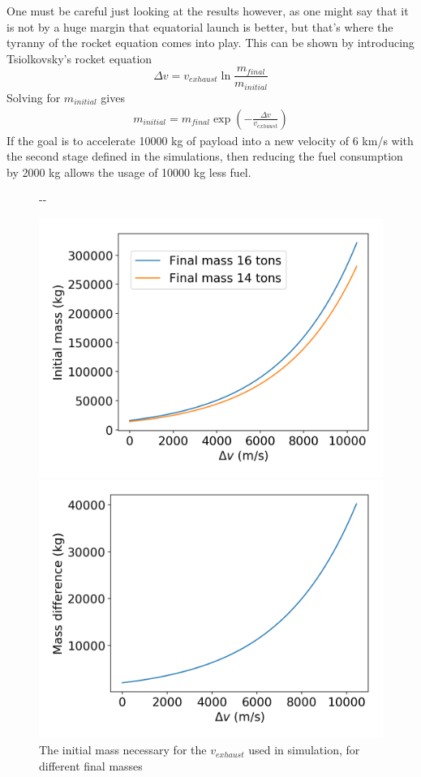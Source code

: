 \documentclass[11pt]{article}
\newlength{\offsetpage}
\newenvironment{widepage}{\begin{adjustwidth}{-\offsetpage}{-\offsetpage}%
    \addtolength{\textwidth}{2\offsetpage}}%
{\end{adjustwidth}}
\begin{document}
One must be careful just looking at the results however, as one might say that it is not by a huge margin that equatorial launch is better, 
but that's where the tyranny of the rocket equation comes into play.
This can be shown by introducing Tsiolkovsky's rocket equation
$$
\Delta v = v_{exhaust} \ln \frac{m_{final}}{m_{initial}}
$$
Solving for $m_{initial}$ gives
$$
\begin{aligned}
  m_{initial} = m_{final} \exp \left( -\frac{\Delta v}{v_{exhaust}} \right)
\end{aligned}
$$
If the goal is to accelerate 10000 kg of payload into a new velocity of 6 km/s with the second stage defined in the simulations, 
then reducing the fuel consumption by 2000 kg allows the usage of 10000 kg less fuel.
\begin{figure}[H]
  \begin{widepage}
    \centering
    \begin{minipage}{0.45\textwidth}
      \centering
      \includegraphics[width=\textwidth]{./plots/consumedToInitial.png}
      \caption{The initial mass necessary for the $v_{exhaust}$ used in simulation, for different final masses}
    \end{minipage}
    \hspace{0.025\textwidth}
    \begin{minipage}{0.45\textwidth}
      \centering
      \includegraphics[width=\textwidth]{./plots/consumedToInitial_diff.png}

\end{minipage}
\end{widepage}
\end{figure}
\end{document}
